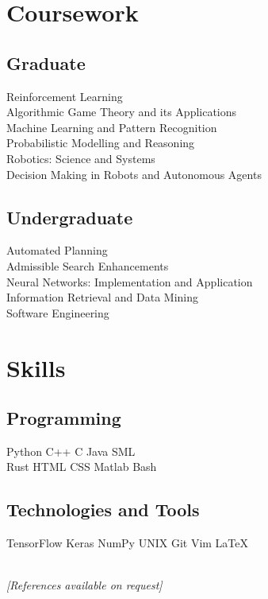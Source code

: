 \documentclass[]{deedy-resume}
\begin{document}
\begin{minipage}[t]{0.33\textwidth}

\section{Coursework}
\subsection{Graduate}
Reinforcement Learning \\
Algorithmic Game Theory and its Applications \\
Machine Learning and Pattern Recognition \\
Probabilistic Modelling and Reasoning \\
Robotics: Science and Systems \\
Decision Making in Robots and Autonomous Agents \\
\sectionsep

\subsection{Undergraduate}
Automated Planning \\
Admissible Search Enhancements \\
Neural Networks: Implementation and Application \\
Information Retrieval and Data Mining \\
Software Engineering \\
\sectionsep


\section{Skills}
\subsection{Programming}
Python \textbullet{} C++ \textbullet{} C \textbullet{} Java \textbullet{} SML
\ \vspace{0.3em} \\
Rust \textbullet{} HTML \textbullet{} CSS \textbullet{} Matlab \textbullet{} Bash \\
\sectionsep

\subsection{Technologies and Tools}
TensorFlow \textbullet{} Keras \textbullet{} NumPy \textbullet{} UNIX \textbullet{} Git \textbullet{} Vim \textbullet{} \LaTeX

\ \\
\small \textit{[References available on request]}

%
%

\end{minipage} 
\end{document}
